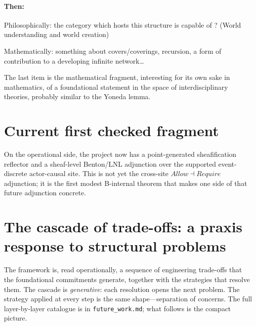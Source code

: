 \documentclass[11pt]{article}
\begin{document}
\paragraph{Then:}
Philosophically: the category which hosts this structure is capable of ?
(World understanding and world creation)

Mathematically: something about covers/coverings, recursion, a form of
contribution to a developing infinite network\ldots{}

\par\medskip
The last item is the mathematical fragment, interesting for its own sake in
mathematics, of a foundational statement in the space of interdisciplinary
theories, probably similar to the Yoneda lemma.

\clearpage
\section*{Current first checked fragment}

On the operational side, the project now has a point-generated sheafification
reflector and a sheaf-level Benton/LNL adjunction over the supported
event-discrete actor-causal site. This is not yet the cross-site \(Allow \dashv
Require\) adjunction; it is the first modest B-internal theorem that makes one
side of that future adjunction concrete.

\section*{The cascade of trade-offs: a praxis response to structural problems}

The framework is, read operationally, a sequence of engineering trade-offs that
the foundational commitments generate, together with the strategies that
resolve them. The cascade is \emph{generative}: each resolution opens the next
problem. The strategy applied at every step is the same shape---separation of
concerns. The full layer-by-layer catalogue is in \texttt{future\_work.md};
what follows is the compact picture.
\end{document}
